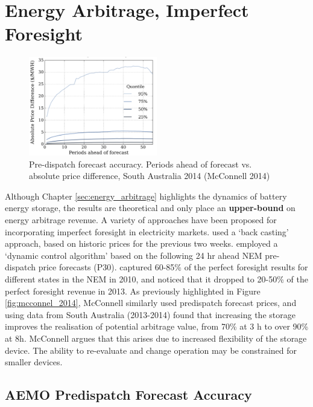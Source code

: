 \chapter{ Energy Arbitrage, Imperfect Foresight }
\label{sec:imperfect_foresight}
\begin{figure}
    \begin{center}
    \centering
\includegraphics[width=0.5\textwidth]{Pictures/Chapter3/mcconnel_imperfect_forecast.png}
    \end{center}
    \caption{Pre-dispatch forecast accuracy. Periods ahead of forecast vs. absolute price difference, South Australia 2014 (McConnell 2014)}
    \label{fig:mcconnell_predispatch_accuracy}
\end{figure}
Although Chapter \ref{sec:energy_arbitrage} highlights the dynamics of battery energy storage, the results are theoretical and only place an \textbf{upper-bound} on energy arbitrage revenue. A  variety of approaches have been proposed for incorporating
imperfect foresight in electricity markets. \parencite{Sioshansi} used a ‘back casting’ approach, based on historic prices for the previous two weeks. \parencite{Wang} employed a `dynamic control algorithm' based on the following 24 hr ahead NEM pre-dispatch price forecasts (P30). \parencite{Wang} captured 60-85\% of the perfect foresight results for different states in the NEM in 2010, and noticed that it dropped to 20-50\% of the perfect foresight revenue in 2013. As previously highlighted in Figure \ref{fig:mcconnel_2014}, McConnell similarly used predispatch forecast prices, and using data from South Australia (2013-2014) found that increasing the storage improves the realisation of potential arbitrage value, from 70\% at 3 h to over 90\% at 8h. McConnell argues that this arises due to increased flexibility of the storage device. The ability to re-evaluate and change operation may be constrained for smaller devices.
\section{ AEMO Predispatch Forecast Accuracy }
